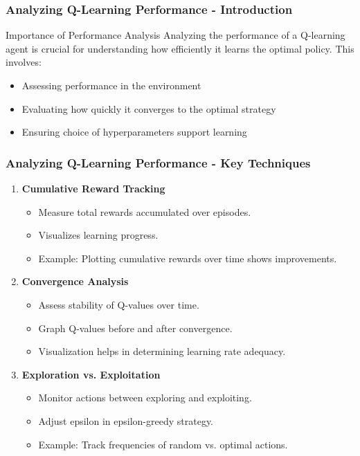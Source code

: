 \documentclass{beamer}
\begin{document}
\begin{frame}[fragile]
    \frametitle{Analyzing Q-Learning Performance - Introduction}
    \begin{block}{Importance of Performance Analysis}
        Analyzing the performance of a Q-learning agent is crucial for understanding how efficiently it learns the optimal policy. This involves:
        \begin{itemize}
            \item Assessing performance in the environment
            \item Evaluating how quickly it converges to the optimal strategy
            \item Ensuring choice of hyperparameters support learning
        \end{itemize}
    \end{block}
\end{frame}

\begin{frame}[fragile]
    \frametitle{Analyzing Q-Learning Performance - Key Techniques}
    \begin{enumerate}
        \item \textbf{Cumulative Reward Tracking}
            \begin{itemize}
                \item Measure total rewards accumulated over episodes.
                \item Visualizes learning progress.
                \item Example: Plotting cumulative rewards over time shows improvements.
            \end{itemize}
        
        \item \textbf{Convergence Analysis}
            \begin{itemize}
                \item Assess stability of Q-values over time.
                \item Graph Q-values before and after convergence.
                \item Visualization helps in determining learning rate adequacy.
            \end{itemize}
        
        \item \textbf{Exploration vs. Exploitation}
            \begin{itemize}
                \item Monitor actions between exploring and exploiting.
                \item Adjust epsilon in epsilon-greedy strategy.
                \item Example: Track frequencies of random vs. optimal actions.
            \end{itemize}
    \end{enumerate}
\end{frame}
\end{document}

